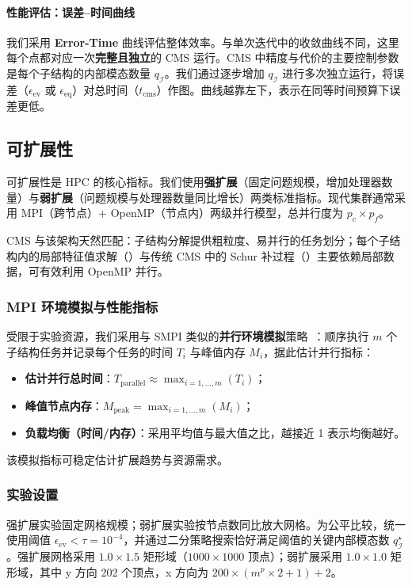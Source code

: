 \paragraph{性能评估：误差--时间曲线}
我们采用 \textbf{Error-Time} 曲线评估整体效率。与单次迭代中的收敛曲线不同，这里每个点都对应一次\textbf{完整且独立}的 CMS 运行。CMS 中精度与代价的主要控制参数是每个子结构的内部模态数量 $q_{\mathcal{I}}$。我们通过逐步增加 $q_{\mathcal{I}}$ 进行多次独立运行，将误差（$\epsilon_{\text{ev}}$ 或 $\epsilon_{\text{eq}}$）对总时间（$t_{\text{cms}}$）作图。曲线越靠左下，表示在同等时间预算下误差更低。

\subsection{可扩展性}
\label{sec:scaling}
可扩展性是 HPC 的核心指标。我们使用\textbf{强扩展}（固定问题规模，增加处理器数量）与\textbf{弱扩展}（问题规模与处理器数量同比增长）两类标准指标。现代集群通常采用 MPI（跨节点）+ OpenMP（节点内）两级并行模型，总并行度为 $p_c\times p_f$。

CMS 与该架构天然匹配：子结构分解提供粗粒度、易并行的任务划分；每个子结构内的局部特征值求解（）与传统 CMS 中的 Schur 补过程（）主要依赖局部数据，可有效利用 OpenMP 并行。

\subsubsection{MPI 环境模拟与性能指标}
受限于实验资源，我们采用与 SMPI 类似的\textbf{并行环境模拟}策略~\cite{Degomme2017SMPI}：顺序执行 $m$ 个子结构任务并记录每个任务的时间 $T_i$ 与峰值内存 $M_i$，据此估计并行指标：
\begin{itemize}
  \item \textbf{估计并行总时间}：$T_{\text{parallel}}\approx\max_{i=1,\dots,m}(T_i)$；
  \item \textbf{峰值节点内存}：$M_{\text{peak}}=\max_{i=1,\dots,m}(M_i)$；
  \item \textbf{负载均衡（时间/内存）}：采用平均值与最大值之比，越接近 1 表示均衡越好。
\end{itemize}
该模拟指标可稳定估计扩展趋势与资源需求。

\subsubsection{实验设置}
强扩展实验固定网格规模；弱扩展实验按节点数同比放大网格。为公平比较，统一使用阈值 $\epsilon_{\text{ev}}<\tau=10^{-4}$，并通过二分策略搜索恰好满足阈值的关键内部模态数 $q_{\mathcal{I}}^\star$。强扩展网格采用 $1.0\times1.5$ 矩形域（$1000\times1000$ 顶点）；弱扩展采用 $1.0\times1.0$ 矩形域，其中 y 方向 202 个顶点，x 方向为 $200\times(m^p\times2+1)+2$。

